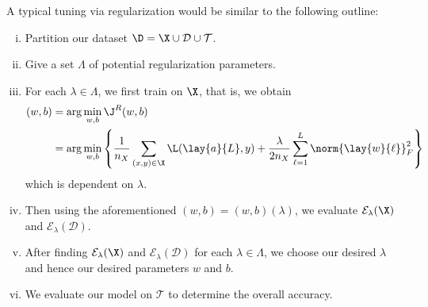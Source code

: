 A typical tuning via regularization would be similar to the following outline:
\begin{enumerate}[i.]
	\item Partition our dataset $\D=\X\cup\mathcal{D}\cup\mathcal{T}$.
	\item Give a set $\Lambda$ of potential regularization parameters.
	\item For each $\lambda\in\Lambda$, we first train on $\X$, that is, we obtain
		\begin{align*}
			(w,b)&=\arg\min_{w,b}\J^R(w,b)\\
			&=\arg\min_{w,b}\left\{\frac{1}{n_X}\sum_{(x,y)\in\X}\L(\lay{a}{L},y)+\frac{\lambda}{2n_X}\sum_{\ell=1}^L\norm{\lay{w}{\ell}}_F^2\right\}
		\end{align*}
		which is dependent on $\lambda$.
	\item Then using the aforementioned $(w,b)=(w,b)(\lambda)$, we evaluate $\mathcal{E}_\lambda(\X)$ and $\mathcal{E}_\lambda(\mathcal{D})$.
	\item After finding $\mathcal{E}_\lambda(\X)$ and $\mathcal{E}_\lambda(\mathcal{D})$ for each $\lambda\in\Lambda$, we choose our desired $\lambda$ and hence our desired parameters $w$ and $b$.
	\item We evaluate our model on $\mathcal{T}$ to determine the overall accuracy.
\end{enumerate}






